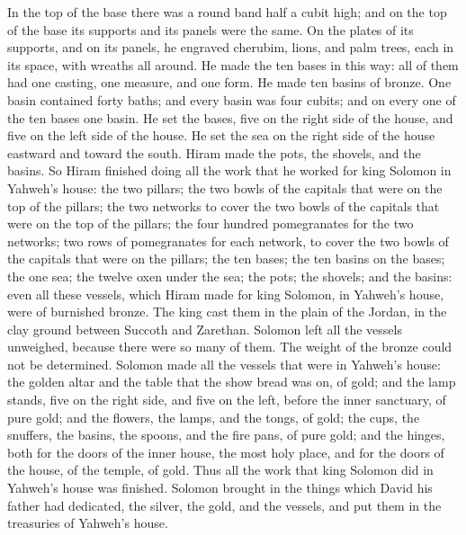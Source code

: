 {In the top of the base there was a round band half a cubit high; and on the top of the base its supports and its panels were the same.
On the plates of its supports, and on its panels, he engraved cherubim, lions, and palm trees, each in its space, with wreaths all around.
He made the ten bases in this way: all of them had one casting, one measure, and one form.
He made ten basins of bronze. One basin contained forty baths; and every basin was four cubits; and on every one of the ten bases one basin.
He set the bases, five on the right side of the house, and five on the left side of the house. He set the sea on the right side of the house eastward and toward the south.
Hiram made the pots, the shovels, and the basins. So Hiram finished doing all the work that he worked for king Solomon in Yahweh’s house:
the two pillars; the two bowls of the capitals that were on the top of the pillars; the two networks to cover the two bowls of the capitals that were on the top of the pillars;
the four hundred pomegranates for the two networks; two rows of pomegranates for each network, to cover the two bowls of the capitals that were on the pillars;
the ten bases; the ten basins on the bases;
the one sea; the twelve oxen under the sea;
the pots; the shovels; and the basins: even all these vessels, which Hiram made for king Solomon, in Yahweh’s house, were of burnished bronze.
The king cast them in the plain of the Jordan, in the clay ground between Succoth and Zarethan.
Solomon left all the vessels unweighed, because there were so many of them. The weight of the bronze could not be determined.
Solomon made all the vessels that were in Yahweh’s house: the golden altar and the table that the show bread was on, of gold;
and the lamp stands, five on the right side, and five on the left, before the inner sanctuary, of pure gold; and the flowers, the lamps, and the tongs, of gold;
the cups, the snuffers, the basins, the spoons, and the fire pans, of pure gold; and the hinges, both for the doors of the inner house, the most holy place, and for the doors of the house, of the temple, of gold.
Thus all the work that king Solomon did in Yahweh’s house was finished. Solomon brought in the things which David his father had dedicated, the silver, the gold, and the vessels, and put them in the treasuries of Yahweh’s house.

}
